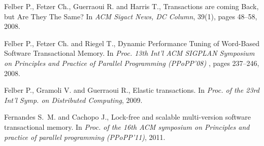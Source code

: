 \begin{thebibliography}{99}
{
Felber P., Fetzer Ch., Guerraoui R. and Harris T., 
Transactions are coming Back, but Are They The Same?
In {\it ACM Sigact News, DC Column}, 39(1), pages 48--58, 2008.

Felber P.,  Fetzer Ch. and  Riegel T., 
Dynamic Performance Tuning of Word-Based Software Transactional Memory. 
In {\it  Proc. 13th  Int'l  ACM SIGPLAN Symposium on Principles and
 Practice of Parallel Programming (PPoPP'08) }, pages 237--246,  2008. 




Felber P., Gramoli V. and Guerraoui R.,
\newblock Elastic transactions.
\newblock In {\em Proc. of the 23rd Int'l Symp. on Distributed Computing},
  2009.

% 
% 
% 







Fernandes S.~M. and Cachopo J.,
\newblock Lock-free and scalable multi-version software transactional memory.
\newblock In {\em Proc. of the 16th ACM symposium on Principles and practice of parallel programming (PPoPP'11)}, 2011.





}
\end{thebibliography}
